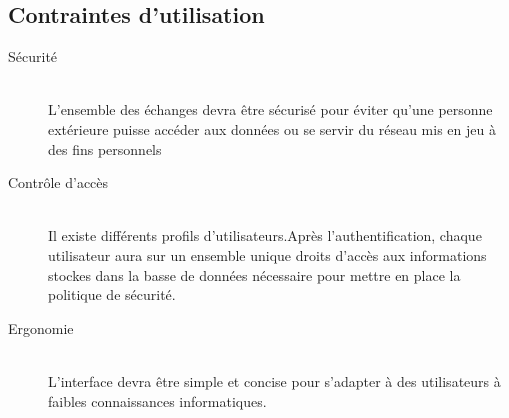 \subsection{Contraintes d'utilisation}

\begin{description}
	\item [Sécurité]\hfill\\
		L'ensemble des échanges devra être sécurisé pour éviter qu'une personne extérieure puisse accéder aux données ou se servir du réseau mis en jeu à des fins personnels\\

	\item [Contrôle d'accès]\hfill\\
		 Il existe différents profils d'utilisateurs.Après l'authentification, chaque utilisateur aura sur un ensemble unique droits d'accès aux informations stockes dans la basse de données nécessaire pour mettre en place la politique de sécurité.
 	
	\item [Ergonomie]\hfill\\
		L'interface devra être simple et concise pour s'adapter à des utilisateurs à faibles connaissances informatiques.\\
\end{description}	
	
